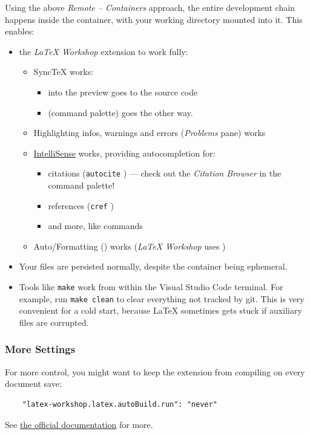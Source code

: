 Using the above \emph{Remote -- Containers} approach, the entire development chain happens inside the container, with your working directory mounted into it.
This enables:
\begin{itemize}
  \item the \emph{LaTeX Workshop} extension to work fully:
        \begin{itemize}
          \item SyncTeX works:
                \begin{itemize}
                  \item {} into the  preview goes to the source code
                  \item {} (command palette) goes the other way.
                \end{itemize}
          \item Highlighting infos, warnings and errors (\emph{Problems} pane) works
          \item \href{https://github.com/James-Yu/LaTeX-Workshop/wiki/Intellisense}{IntelliSense} works, providing autocompletion for:
                \begin{itemize}
                  \item citations (\texttt{autocite} ) --- check out the \emph{Citation Browser} in the command palette!
                  \item references (\texttt{cref} )
                  \item and more, like commands
                \end{itemize}
          \item Auto\-/Formatting () works (\emph{LaTeX Workshop} uses )
        \end{itemize}
  \item Your files are persisted normally, despite the container being ephemeral.
  \item Tools like \texttt{make} work from within the Visual Studio Code terminal.
        For example, run \texttt{make clean} to clear everything not tracked by git.
        This is very convenient for a cold start, because \LaTeX{} sometimes gets stuck if auxiliary files are corrupted.
\end{itemize}

\subsubsection{More Settings}
For more control, you might want to keep the extension from compiling on every document save:
\begin{verbatim}
    "latex-workshop.latex.autoBuild.run": "never"
\end{verbatim}
See \href{https://github.com/James-Yu/LaTeX-Workshop/wiki/Compile#latex-recipes}{the official documentation} for more.

